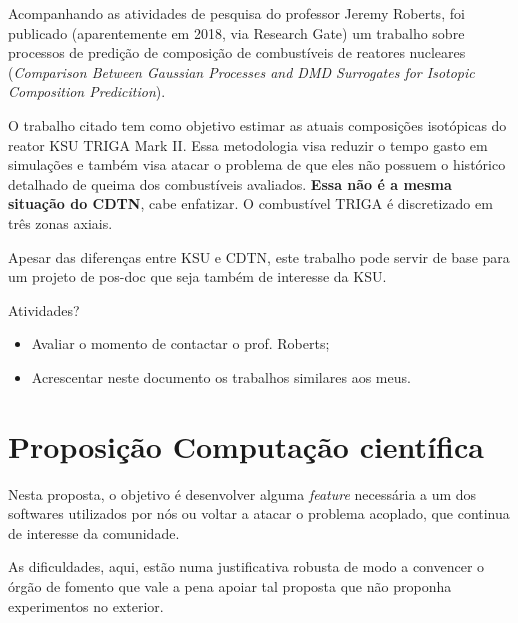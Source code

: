 Acompanhando as atividades de pesquisa do professor Jeremy Roberts, foi publicado 
(aparentemente em 2018, via Research Gate) um trabalho sobre processos de predição de composição de combustíveis de reatores nucleares (\textit{Comparison Between Gaussian Processes and DMD Surrogates for Isotopic Composition Predicition}\cite{Roberts}).

O trabalho citado tem como objetivo estimar as atuais composições isotópicas 
do reator KSU TRIGA Mark II. Essa metodologia visa reduzir o tempo gasto em 
simulações e também visa atacar o problema de que eles não possuem o histórico 
detalhado de queima dos combustíveis avaliados. \textbf{Essa não é a mesma 
situação do CDTN}, cabe enfatizar. O combustível TRIGA é discretizado em 
três zonas axiais.

Apesar das diferenças entre KSU e CDTN, este trabalho pode servir de base 
para um projeto de pos-doc que seja também de interesse da KSU.

Atividades?
\begin{itemize}
\item Avaliar o momento de contactar o prof. Roberts;
\item Acrescentar neste documento os trabalhos similares aos meus.
\end{itemize}



\section{Proposição Computação científica}

Nesta proposta, o objetivo é desenvolver alguma \textit{feature} necessária a um 
dos softwares utilizados por nós ou voltar a atacar o problema acoplado, que 
continua de interesse da comunidade.

As dificuldades, aqui, estão numa justificativa robusta de modo a convencer o 
órgão de fomento que vale a pena apoiar tal proposta que não proponha experimentos 
no exterior.


